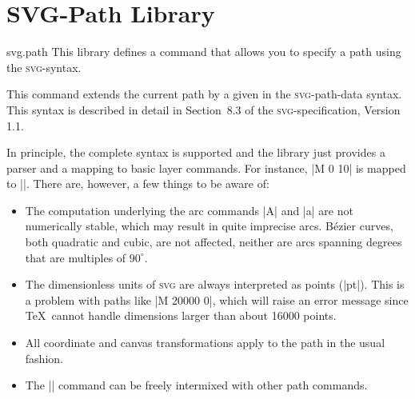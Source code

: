 %
%
%


\section{SVG-Path Library}
\label{section-library-svg-path}

\begin{pgflibrary}{svg.path}
  This library defines a command that allows you to specify a path
  using the \textsc{svg}-syntax.
\end{pgflibrary}

\begin{command}{\pgfpathsvg{}}
  This command extends the current path by a  given in the
  \textsc{svg}-path-data syntax. This syntax is described in detail in
  Section~8.3 of the \textsc{svg}-specification, Version 1.1. 

  In principle, the complete syntax is supported and the library just
  provides a parser and a mapping to basic layer commands. For
  instance, |M 0 10| is mapped to
  |\pgfpathmoveto{\pgfpoint{0pt}{10pt}}|. There are, however, a few things
  to be aware of:
  \begin{itemize}
  \item The computation underlying the arc commands |A| and |a|
    are not numerically stable, which may result in quite imprecise
    arcs. B\'ezier curves, both quadratic and cubic, are not affected,
    neither are arcs spanning degrees that are multiples of
    $90^{\circ}$.
  \item The dimensionless units of \textsc{svg} are always interpreted
    as points (|pt|). This is a problem with paths like |M 20000 0|,
    which will raise an error message since \TeX\ cannot handle
    dimensions larger than about 16000 points.
  \item
    All coordinate and canvas transformations apply to the path in the
    usual fashion.
  \item
    The |\pgfpathsvg| command can be freely intermixed with other path
    commands. 
  \end{itemize}
\begin{codeexample}[]
\begin{pgfpicture}
\end{pgfpicture}
\end{codeexample}
\end{command}


